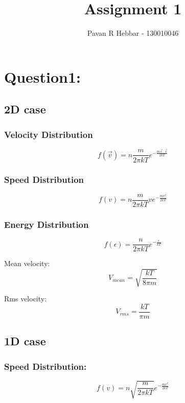 \documentclass[11pt, a4paper]{article}
\title{\textbf{Assignment 1}}
\author{Pavan R Hebbar - 130010046}
\begin{document}
\maketitle
\newpage
\section{Question1:}
\subsection{2D case}
\subsubsection{Velocity Distribution}
\begin{equation}
 f(\vec{v}) = n\frac{m}{2\pi k T}e^{-\frac{m\vec{v}\cdot\vec{v}}{2kT}}
\end{equation}
\subsubsection{Speed Distribution}
\begin{equation}
 f(v) = n \frac{m}{2\pi k T}ve^{-\frac{mv^2}{2kT}}
\end{equation}

\subsubsection{Energy Distribution}
\begin{equation}
 f(\epsilon) = \frac{n}{2\pi kT}e^{-\frac{\epsilon}{kT}}
\end{equation}

Mean velocity:
\begin{equation}
 V_{mean} = \sqrt{\frac{kT}{8\pi m}}
\end{equation}

Rms velocity:
\begin{equation}
 V_{rms} = \frac{kT}{\pi m}
\end{equation}


\subsection{1D case}
\subsubsection{Speed Distribution:}
\begin{equation}
 f(v) = n\sqrt{\frac{m}{2\pi kT}}e^{-\frac{mv^2}{2kT}}
\end{equation}
\end{document}
